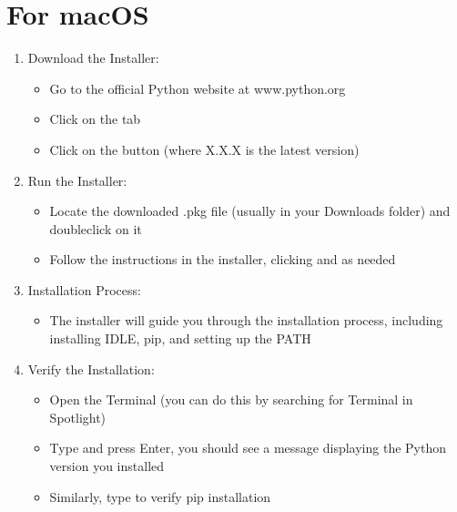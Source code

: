 \documentclass[letterpaper,10pt,english]{jupyterBook}
\begin{document}
\part{For macOS}
\label{\detokenize{_pages/0.1_Installing_Python:for-macos}}\begin{enumerate}
%
\item {} 
\sphinxAtStartPar
Download the Installer:
\begin{itemize}
\item {} 
\sphinxAtStartPar
Go to the official Python website at www.python.org

\item {} 
\sphinxAtStartPar
Click on the  tab

\item {} 
\sphinxAtStartPar
Click on the  button (where X.X.X is the latest version)

\end{itemize}

\item {} 
\sphinxAtStartPar
Run the Installer:
\begin{itemize}
\item {} 
\sphinxAtStartPar
Locate the downloaded .pkg file (usually in your Downloads folder) and double\sphinxhyphen{}click on it

\item {} 
\sphinxAtStartPar
Follow the instructions in the installer, clicking  and  as needed

\end{itemize}

\item {} 
\sphinxAtStartPar
Installation Process:
\begin{itemize}
\item {} 
\sphinxAtStartPar
The installer will guide you through the installation process, including installing IDLE, pip, and setting up the PATH

\end{itemize}

\item {} 
\sphinxAtStartPar
Verify the Installation:
\begin{itemize}
\item {} 
\sphinxAtStartPar
Open the Terminal (you can do this by searching for Terminal in Spotlight)

\item {} 
\sphinxAtStartPar
Type  and press Enter, you should see a message displaying the Python version you installed

\item {} 
\sphinxAtStartPar
Similarly, type  to verify pip installation

\end{itemize}

\end{enumerate}
\end{document}
